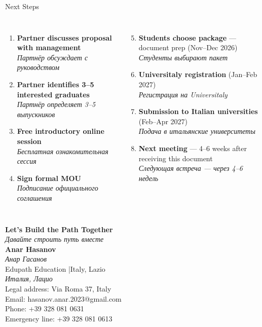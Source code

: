 \documentclass[aspectratio=169]{beamer}
\newcommand{\ru}[1]{{\textit{#1}}}
\newcommand{\biframe}[2]{\begin{frame}{#1}\noindent{\scriptsize\textit{#2}}\vspace{0.2em}}
\begin{document}
\biframe{Next Steps}{Следующие шаги}
\begin{columns}[T]
\begin{enumerate}\setlength{\itemsep}{0.2em}
  \item \textbf{Partner discusses proposal with management}\\
    \ru{Партнёр обсуждает с руководством}
  \item \textbf{Partner identifies 3–5 interested graduates}\\
    \ru{Партнёр определяет 3–5 выпускников}
  \item \textbf{Free introductory online session}\\
    \ru{Бесплатная ознакомительная сессия}
  \item \textbf{Sign formal MOU}\\
    \ru{Подписание официального соглашения}
\end{enumerate}

\begin{enumerate}\setcounter{enumi}{4}\setlength{\itemsep}{0.2em}
  \item \textbf{Students choose package} — document prep (Nov–Dec 2026)\\
    \ru{Студенты выбирают пакет}
  \item \textbf{Universitaly registration} (Jan–Feb 2027)\\
    \ru{Регистрация на Universitaly}
  \item \textbf{Submission to Italian universities} (Feb–Apr 2027)\\
    \ru{Подача в итальянские университеты}
  \item \textbf{Next meeting} — 4–6 weeks after receiving this document\\
    \ru{Следующая встреча — через 4–6 недель}
\end{enumerate}
\end{columns}
\end{frame}

\begin{frame}[plain]
\vfill
\centering
{\Large\textbf{Let's Build the Path Together}}\\[0.3em]
{\large\textit{Давайте строить путь вместе}}\\[1.5em]
{\normalsize\textbf{Anar Hasanov}}\\[0.1em]
{\ru{Анар Гасанов}}\\[0.5em]
{\small Edupath Education \quad|\quad Italy, Lazio}\\[0.1em]
{\ru{Италия, Лацио}}\\[0.8em]
{\small Legal address: Via Roma 37, Italy}\\[0.3em]
{\small Email: hasanov.anar.2023@gmail.com}\\[0.3em]
{\small Phone: +39 328 081 0631}\\[0.3em]
{\small Emergency line: +39 328 081 0613}
\vfill
\end{frame}
\end{document}
